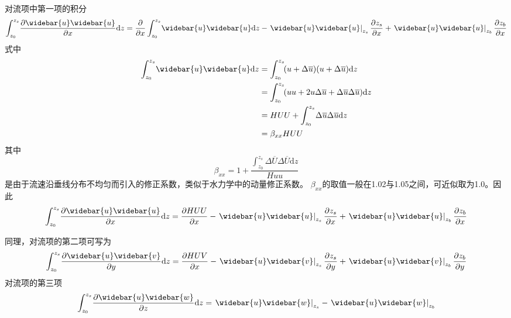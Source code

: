 对流项中第一项的积分
\begin{equation}
    \int_{z_0}^{ z_{s}}\!
    \frac{\partial \widebar{u}\widebar{u}}{\partial x}
    \mathrm{d}z
    =
    \frac{\partial}{\partial x}
    \int_{z_0}^{ z_{s}}\!
    \widebar{u}\widebar{u}
    \mathrm{d}z
    -
    \left.\widebar{u}\widebar{u}\right|_{z_{s}}\frac{\partial  z_{s}}{\partial x}
    +
    \left.\widebar{u}\widebar{u}\right|_{z_{b}}\frac{\partial z_{b}}{\partial x}
    \label{EqCGe_CT_1st}
\end{equation}
式中
\begin{equation*}
    \begin{aligned}
    \int_{z_0}^{ z_{s}}\!
    \widebar{u}\widebar{u}
    \mathrm{d}z
    &=
    \int_{z_0}^{ z_{s}}\!
    (u+\Delta\overline{u})(u+\Delta\overline{u})
    \mathrm{d}z
    \\
    &=
    \int_{z_0}^{ z_{s}}\!
    (uu+2u\Delta\overline{u}+\Delta\overline{u}\Delta\overline{u})
    \mathrm{d}z
    \\
    &=
    HUU
    +
    \int_{z_0}^{ z_{s}}\!
    \Delta\overline{u}\Delta\overline{u}
    \mathrm{d}z
    \\
    &=
    \beta_{xx}HUU
    \end{aligned}
\end{equation*}
其中
\begin{equation}
\beta_{xx}
=
1 +
\frac
{
\int_{z_0}^{ z_{s}}\!
    \Delta\overline{U}\Delta\overline{U}
\mathrm{d}z
}
{Huu}
\end{equation}
是由于流速沿垂线分布不均匀而引入的修正系数，类似于水力学中的动量修正系数。
$\beta_{xx}$的取值一般在1.02与1.05之间，可近似取为1.0。因此
\begin{equation}
    \int_{z_0}^{ z_{s}}\!
    \frac{\partial \widebar{u}\widebar{u}}{\partial x}
    \mathrm{d}z
    =
    \frac{\partial HUU}{\partial x}
    -
    \left.\widebar{u}\widebar{u}\right|_{z_{s}}\frac{\partial  z_{s}}{\partial x}
    +
    \left.\widebar{u}\widebar{u}\right|_{z_{b}}\frac{\partial z_{b}}{\partial x}
\end{equation}

同理，对流项的第二项可写为
\begin{equation}
    \int_{z_0}^{ z_{s}}\!
    \frac{\partial \widebar{u}\widebar{v}}{\partial y}
    \mathrm{d}z
    =
    \frac{\partial HUV}{\partial x}
    -
    \left.\widebar{u}\widebar{v}\right|_{z_{s}}\frac{\partial  z_{s}}{\partial y}
    +
    \left.\widebar{u}\widebar{v}\right|_{z_{b}}\frac{\partial z_{b}}{\partial y}
\end{equation}
对流项的第三项
\begin{equation}
    \int_{z_0}^{ z_{s}}\!
    \frac{\partial \widebar{u}\widebar{w}}{\partial z}
    \mathrm{d}z
    =
    \left.\widebar{u}\widebar{w}\right|_{z_{s}}
    -
    \left.\widebar{u}\widebar{w}\right|_{z_{b}}
\end{equation}

